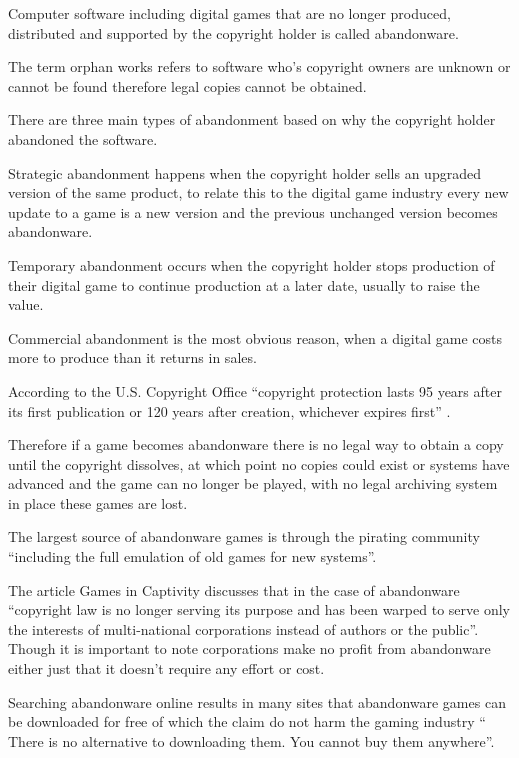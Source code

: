 \documentclass{scrartcl}
\begin{document}
Computer software including digital games that are no longer produced, distributed and supported by the copyright holder is called abandonware.

The term orphan works refers to software who's copyright owners are unknown or cannot be found therefore legal copies cannot be obtained.\cite{khong2006orphan}


There are three main types of abandonment based on why the copyright holder abandoned the software.

Strategic abandonment happens when the copyright holder sells an upgraded version of the same product, to relate this to the digital game industry every new update to a game is a new version and the previous unchanged version becomes abandonware.

Temporary abandonment occurs when the copyright holder stops production of their digital game to continue production at a later date, usually to raise the value.

Commercial abandonment is the most obvious reason, when a digital game costs more to produce than it returns in sales. 

According to the U.S. Copyright Office ``copyright protection lasts 95 years after its first publication or 120 years after creation, whichever expires first'' \cite{gov}.

Therefore if a game becomes abandonware there is no legal way to obtain a copy until the copyright dissolves, at which point no copies could exist or systems have advanced and the game can no longer be played, with no legal archiving system in place these games are lost\cite{gooding2008grand}.

The largest source of abandonware games is through the pirating community ``including the full emulation of old games for new systems''\cite{gooding2008grand}.

The article Games in Captivity discusses that in the case of abandonware ``copyright law is no longer serving its purpose and has been warped to serve only the interests of multi-national corporations instead of authors or the public''\cite{barton2005games}. Though it is important to note corporations make no profit from abandonware either just that it doesn't require any effort or cost.

Searching abandonware online results in many sites that abandonware games can be downloaded for free of which the claim do not harm the gaming industry `` There is no alternative to downloading them. You cannot buy them anywhere''\cite{barwick2008barriers}.
\end{document}
